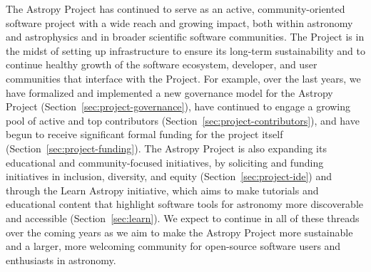 \documentclass[modern]{aastex631}
\begin{document}
The Astropy Project has continued to serve as an active, community-oriented
software project with a wide reach and growing impact, both within astronomy and
astrophysics and in broader scientific software communities.
The Project is in the midst of setting up infrastructure to ensure its long-term
sustainability and to continue healthy growth of the software ecosystem,
developer, and user communities that interface with the Project.
For example, over the last years, we have formalized and implemented a new
governance model for the Astropy Project (Section~\ref{sec:project-governance}),
have continued to engage a growing pool of active and top contributors
(Section~\ref{sec:project-contributors}), and have begun to receive significant
formal funding for the project itself (Section~\ref{sec:project-funding}).
The Astropy Project is also expanding its educational and community-focused
initiatives, by soliciting and funding initiatives in inclusion, diversity, and
equity (Section~\ref{sec:project-ide}) and through the Learn Astropy initiative,
which aims to make tutorials and educational content that highlight software
tools for astronomy more discoverable and accessible (Section~\ref{sec:learn}).
We expect to continue in all of these threads over the coming years as we aim to
make the Astropy Project more sustainable and a larger, more welcoming community
for open-source software users and enthusiasts in astronomy.
\end{document}
